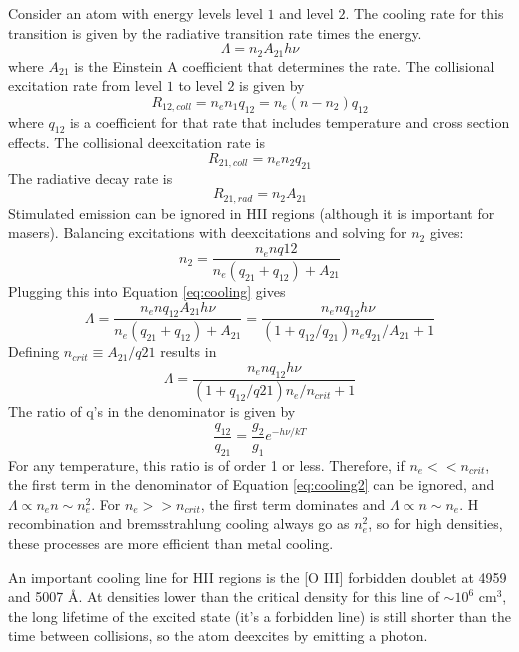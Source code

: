 Consider an atom with energy levels level $1$ and level $2$.  The cooling rate for this 
transition is given by the radiative transition rate times the energy.
\begin{equation}\label{eq:cooling}
\Lambda=n_2A_{21}h\nu
\end{equation}
where $A_{21}$ is the Einstein A coefficient that determines the rate.  The collisional excitation 
rate from level $1$ to level $2$ is given by 
\begin{equation}
R_{12,coll}=n_en_1q_{12}=n_e(n-n_2)q_{12}
\end{equation}
where $q_{12}$ is a coefficient for that rate that includes temperature and cross section 
effects.  The collisional deexcitation rate is 
\begin{equation}
R_{21,coll}=n_en_2q_{21}
\end{equation}
The radiative decay rate is 
\begin{equation}
R_{21,rad}=n_2A_{21}
\end{equation}
Stimulated emission can be ignored in HII regions (although it is important for masers).  
Balancing excitations with deexcitations and solving for $n_2$ gives:
\begin{equation}
n_2=\frac{n_enq{12}}{n_e(q_{21}+q_{12})+A_{21}}
\end{equation}
Plugging this into Equation \ref{eq:cooling} gives
\begin{equation}
\Lambda=\frac{n_enq_{12}A_{21}h\nu}{n_e(q_{21}+q_{12})+A_{21}}=\frac{n_enq_{12}h\nu}{(1+q_{12}/q_{21})n_eq_{21}/A_{21}+1}
\end{equation}
Defining $n_{crit}\equiv A_{21}/q{21}$ results in 
\begin{equation}\label{eq:cooling2}
\Lambda=\frac{n_enq_{12}h\nu}{(1+q_{12}/q{21})n_e/n_{crit}+1}
\end{equation}
The ratio of q's in the denominator is given by 
\begin{equation}
\frac{q_{12}}{q_{21}}=\frac{g_2}{g_1}e^{-h\nu/kT}
\end{equation}
For any temperature, this ratio is of order 1 or less.  Therefore, if $n_e<<n_{crit}$, the first 
term in the denominator of Equation \ref{eq:cooling2} can be ignored, and 
$\Lambda\propto n_en\sim n_e^2$.  For $n_e>>n_{crit}$, the first term dominates and 
$\Lambda\propto n\sim n_e$.  H recombination and bremsstrahlung cooling always go as $n_e^2$, 
so for high densities, these processes are more efficient than metal cooling.  

An important cooling line for HII regions is the [O III] forbidden doublet at 4959 and 5007 \AA.  
At densities lower than the critical density for this line of $\sim10^6$ cm$^3$, the long lifetime 
of the excited state (it's a forbidden line) is still shorter than the time between collisions, 
so the atom deexcites by emitting a photon.  

